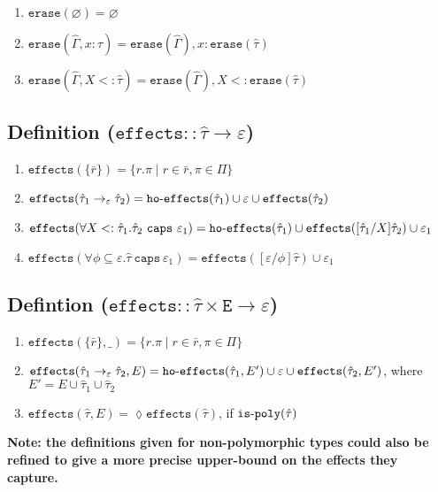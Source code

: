 \documentclass{llncs}
\newcommand{\keywadj}[1]{\mathtt{#1}}
\newcommand{\keyw}[1]{\keywadj{#1}~}
\newcommand{\kw}[1]{\keyw{ #1 }}
\newcommand{\kwa}[1]{\keywadj{ #1 }}
\newcommand{\hyphen}{\hbox{-}}
\newcommand{\fx}[1]{ \kwa{effects}(#1) }
\newcommand{\hofx}[1]{ \kwa{ho \hyphen effects}(#1) }
\newcommand{\erase}[1]{
	\keywadj{erase}(#1)
}
\newcommand{\polycap}[3]{
	\forall #1. #2~ \kw{caps} #3
}
\begin{document}
\begin{enumerate}
	\item $\erase{\varnothing} = \varnothing$
	\item $\erase{\hat \Gamma, x: \hat \tau} = \erase{\hat \Gamma}, x: \erase{\hat \tau}$
	\item $\erase{\hat \Gamma, X <: \hat \tau} = \erase{\hat \Gamma}, X <: \erase{\hat \tau}$
\end{enumerate}



\subsection*{Definition ($\kwa{effects :: \hat \tau \rightarrow \varepsilon}$)}

\begin{enumerate}
	\item $\fx{\{ \bar r \}} = \{ r.\pi \mid r \in \bar r, \pi \in \Pi \}$
	\item $\fx{\hat \tau_1 \rightarrow_{\varepsilon} \hat \tau_2} = \kwa{ho \hyphen effects}(\hat \tau_1) \cup \varepsilon \cup \kwa{effects}(\hat \tau_2)$
	\item $\fx{\polycap{X <: \hat \tau_1}{\hat \tau_2}{\varepsilon_1}} = \hofx{\hat \tau_1} \cup \fx{[\hat \tau_1/X]\hat \tau_2} \cup \varepsilon_1$
	\item $\fx{\polycap{\phi \subseteq \varepsilon}{\hat \tau}{\varepsilon_1}} = \fx{[\varepsilon/\phi]\hat \tau} \cup \varepsilon_1$
\end{enumerate}


\subsection*{Defintion ($\kwa{effects :: \hat \tau \times E \rightarrow \varepsilon}$)}

\begin{enumerate}
	\item $\fx{\{ \bar r \}, \_} = \{ r.\pi \mid r \in \bar r, \pi \in \Pi \}$
	\item $\fx{\hat \tau_1 \rightarrow_{\varepsilon} \hat \tau_2, E} = \kwa{ho \hyphen effects}(\hat \tau_1, E') \cup \varepsilon \cup \kwa{effects}(\hat \tau_2, E')$, where $E' = E \cup \hat \tau_1 \cup \hat \tau_2$
	\item $\fx{\hat \tau, E} = \lozenge\fx{\hat \tau}$, if $\kwa{is \hyphen poly}(\hat \tau)$
\end{enumerate}

\noindent
\textbf{Note: the definitions given for non-polymorphic types could also be refined to give a more precise upper-bound on the effects they capture.}
\end{document}
